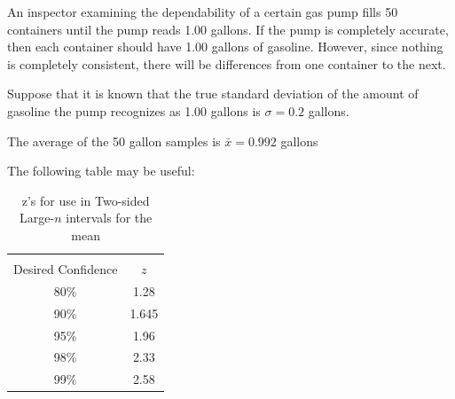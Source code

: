 \documentclass[addpoints]{examsetup}\usepackage[]{graphicx}\usepackage[]{color}
\begin{document}
\begin{questions}
 
\newpage

\question

An inspector examining the dependability of a certain gas pump fills 50 containers until the pump reads 1.00 gallons. 
If the pump is completely accurate, then each container should have 1.00 gallons of gasoline.
However, since nothing is completely consistent, there will be differences from one container to the next.

Suppose that it is known that the true standard deviation of the amount of gasoline the pump recognizes as 1.00 gallons is $\sigma = 0.2$ gallons.

The average of the 50 gallon samples is $\bar{x} = 0.992$ gallons

The following table may be useful:

\begin{table}[h]
   \centering
   \caption{z's for use in Two-sided Large-$n$ intervals for the mean}
   \begin{tabular}{cc}
      \hline \\
      Desired Confidence & $z$ \\
      \hline 
      80\% & 1.28 \\
      90\% & 1.645 \\
      95\% & 1.96 \\
      98\% & 2.33 \\
      99\% & 2.58 \\
      \hline 
   \end{tabular}
\end{table}


\end{questions}
\end{document}
